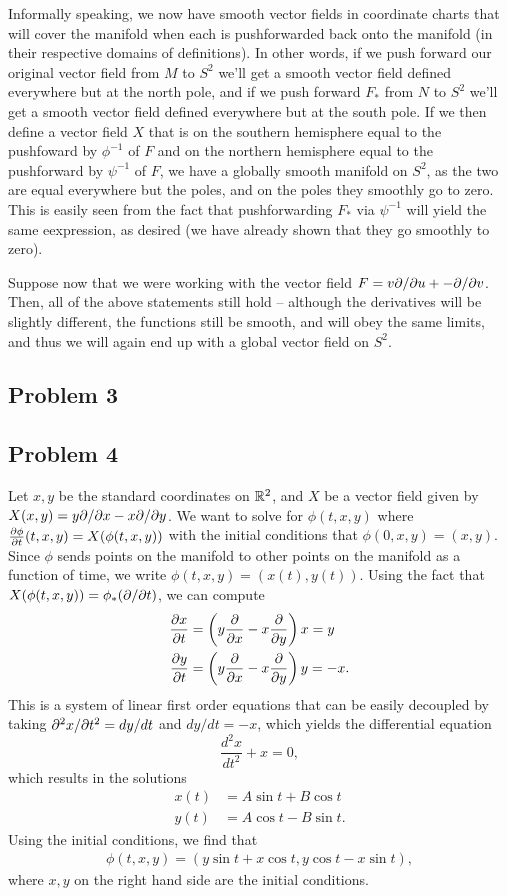 \documentclass{../../mathnotes}
\begin{document}
Informally speaking, we now have smooth vector fields in coordinate charts that will cover the manifold when
each is pushforwarded back onto the manifold (in their respective domains of definitions). In other words, if
we push forward our original vector field from $M$ to $S^2$ we'll get a smooth vector field defined everywhere
but at the north pole, and if we push forward $F_*$ from $N$ to $S^2$ we'll get a smooth vector field defined
everywhere but at the south pole. If we then define a vector field $X$ that is on the southern hemisphere
equal to the pushfoward by $\phi^{-1}$ of $F$ and on the northern hemisphere equal to the pushforward by
$\psi^{-1}$ of $F$, we have a globally smooth manifold on $S^2$, as the two are equal everywhere but the poles,
and on the poles they smoothly go to zero. This is easily seen from the fact that pushforwarding $F_*$ via
$\psi^{-1}$ will yield the same eexpression, as desired (we have already shown that they go smoothly to zero).

Suppose now that we were working with the vector field $F=v\partial/\partial u+-\partial/\partial v$. Then, all of the above statements
still hold -- although the derivatives will be slightly different, the functions still be smooth, and will obey
the same limits, and thus we will again end up with a global vector field on $S^2$.

\subsection*{Problem 3}


\subsection*{Problem 4}

Let $x,y$ be the standard coordinates on $\mathbb{R}^2$, and $X$ be a vector field given by $X(x,y)=y\partial/\partial x-x\partial/\partial y$.
We want to solve for $\phi(t,x,y)$ where $\frac{\partial\phi}{\partial t}(t,x,y)=X(\phi(t,x,y))$ with the initial
conditions that $\phi(0,x,y)=(x,y)$. Since $\phi$ sends points on the manifold to other points on the manifold
as a function of time, we write $\phi(t,x,y)=(x(t),y(t))$. Using the fact that $X(\phi(t,x,y))=\phi_*(\partial/\partial t)$,
we can compute
\begin{align*}
    \frac{\partial x}{\partial t}&=\left( y\frac{\partial}{\partial x}-x\frac{\partial}{\partial y} \right)x=y\\
    \frac{\partial y}{\partial t}&=\left( y\frac{\partial}{\partial x}-x\frac{\partial}{\partial y} \right)y=-x.
\end{align*}
This is a system of linear first order equations that can be easily decoupled by taking
$\partial^2x/\partial t^2=dy/dt$ and $dy/dt=-x$, which yields the differential equation
\[\frac{d^2x}{dt^2}+x=0,\]
which results in the solutions
\begin{align*}
    x(t)&=A\sin t+B\cos t\\
    y(t)&=A\cos t-B\sin t.
\end{align*}
Using the initial conditions, we find that
\begin{align*}
    \phi(t,x,y)=\left( y\sin t+x\cos t,y\cos t-x\sin t \right),
\end{align*}
where $x,y$ on the right hand side are the initial conditions.
\end{document}
